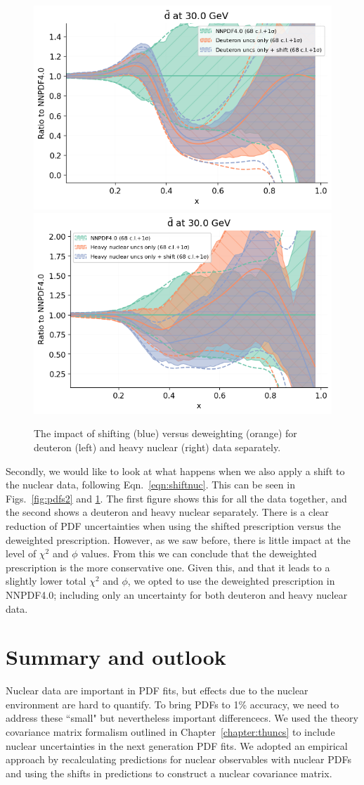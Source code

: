 \begin{figure}[H]
  \begin{center}
      \includegraphics[width=0.49\linewidth]{nuclear/plots/deutcomp.png}
     \includegraphics[width=0.49\linewidth]{nuclear/plots/nuccomp.png}
    \caption{The impact of shifting (blue) versus deweighting (orange) for deuteron (left) and heavy nuclear (right) data separately.
    \label{fig:pdfs3} }
    \end{center}
\end{figure}   
Secondly, we would like to look at what happens when we also apply a shift to the nuclear data, following Eqn.~\ref{eqn:shiftnuc}. This can be seen in Figs.~\ref{fig:pdfs2} and \ref{fig:pdfs3}. The first figure shows this for all the data together, and the second shows a deuteron and heavy nuclear separately. There is a clear reduction of PDF uncertainties when using the shifted prescription versus the deweighted prescription. However, as we saw before, there is little impact at the level of $\chi^2$ and $\phi$ values. From this we can conclude that the deweighted prescription is the more conservative one. Given this, and that it leads to a slightly lower total $\chi^2$ and $\phi$, we opted to use the deweighted prescription in NNPDF4.0; including only an uncertainty for both deuteron and heavy nuclear data.


\section{Summary and outlook}
Nuclear data are important in PDF fits, but effects due to the nuclear environment are hard to quantify. To bring PDFs to 1\% accuracy, we need  to address these ``small" but nevertheless important differencecs. We used the theory covariance matrix formalism outlined in Chapter~\ref{chapter:thuncs} to include nuclear uncertainties in the next generation PDF fits. We adopted an empirical approach by recalculating predictions for nuclear observables with nuclear PDFs and using the shifts in predictions to construct a nuclear covariance matrix. 

